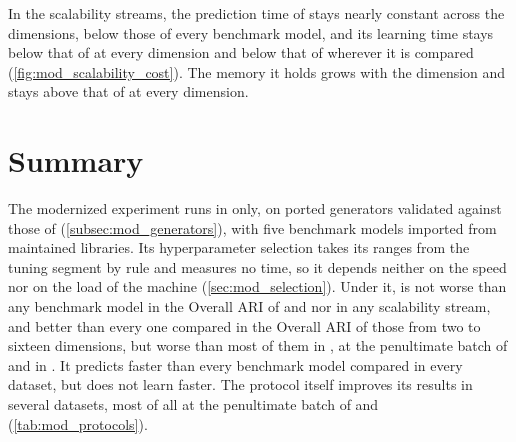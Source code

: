 In the scalability streams, the prediction time of \MicroTEDAClusPlus stays nearly constant across the dimensions, below those of every benchmark model, and its learning time stays below that of \DBSTREAM at every dimension and below that of \BIRCH wherever it is compared (\cref{fig:mod_scalability_cost}). The memory it holds grows with the dimension and stays above that of \MiniBatchKMeans at every dimension.

\section{Summary}
\label{sec:mod_summary}

The modernized experiment runs in  only, on ported generators validated against those of  (\cref{subsec:mod_generators}), with five benchmark models imported from maintained libraries. Its hyperparameter selection takes its ranges from the tuning segment by rule and measures no time, so it depends neither on the speed nor on the load of the machine (\cref{sec:mod_selection}). Under it, \MicroTEDAClusPlus is not worse than any benchmark model in the Overall ARI of \BenchmarkOne and \Cassini nor in any scalability stream, and better than every one compared in the Overall ARI of those from two to sixteen dimensions, but worse than most of them in \BenchmarkTwo, at the penultimate batch of \RandomRBFGeneratorEvents and in \ChameleonDSThree. It predicts faster than every benchmark model compared in every dataset, but does not learn faster. The protocol itself improves its results in several datasets, most of all at the penultimate batch of \BenchmarkOne and \Cassini (\cref{tab:mod_protocols}).
